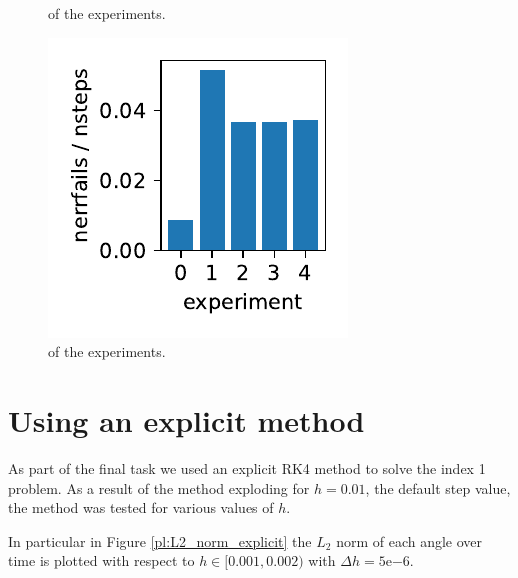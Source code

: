 \documentclass{report}
\begin{document}
\begin{figure}[h]
\begin{minipage}[t]{0.3\textwidth}
\caption{ of the experiments.}
\label{pl:njacs_nsteps_indx1}
\end{minipage}
\hfill
\begin{minipage}[t]{0.3\textwidth}
\centering
\includegraphics[width=\textwidth]{../Plots/Project2_main/Figure_712}
\caption{ of the experiments.}
\label{pl:nerrfails_nsteps_indx1}
\end{minipage}
\end{figure}

\section*{Using an explicit method}

As part of the final task we used an explicit RK4 method to solve the index 1 problem. As a result of the method exploding for $h=0.01$, the default step value, the method was tested for various values of $h$.

In particular in Figure \ref{pl:L2_norm_explicit} the $L_2$ norm of each angle over time is plotted with respect to $h \in [0.001, 0.002)$ with $\Delta h = 5\mathrm{e}{-6}$.
\end{document}
